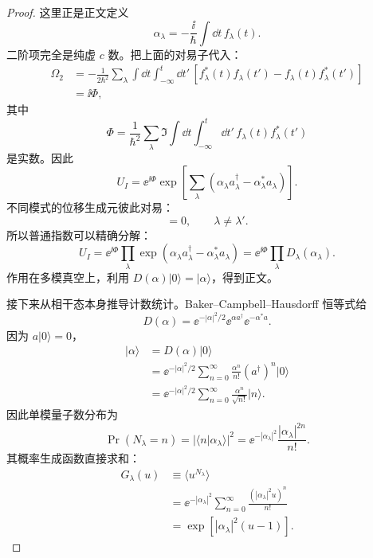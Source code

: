 \begin{proof}
这里正是正文定义
\begin{equation*}
 \alpha_\lambda=-\frac{\ii}{\hbar}\int\dd t\,f_\lambda(t).
\end{equation*}
二阶项完全是纯虚 $c$ 数。把上面的对易子代入：
\begin{align*}
 \Omega_2
 &=-\frac1{2\hbar^2}
 \sum_\lambda
 \int\dd t\int_{-\infty}^{t}\dd t'\,
 \left[f_\lambda^*(t)f_\lambda(t')
 -f_\lambda(t)f_\lambda^*(t')\right]\\
 &=\ii\Phi,
\end{align*}
其中
\begin{equation*}
 \Phi
 =\frac1{\hbar^2}
 \sum_\lambda
 \Im\int\dd t\int_{-\infty}^{t}\dd t'\,
 f_\lambda(t)f_\lambda^*(t')
\end{equation*}
是实数。因此
\begin{equation*}
 U_I
 =\ee^{\ii\Phi}
 \exp\!\left[
 \sum_\lambda
 (\alpha_\lambda a_\lambda^\dagger
 -\alpha_\lambda^*a_\lambda)
 \right].
\end{equation*}
不同模式的位移生成元彼此对易：
\begin{equation*}
 [\alpha_\lambda a_\lambda^\dagger-\alpha_\lambda^*a_\lambda,
 \alpha_{\lambda'}a_{\lambda'}^\dagger-\alpha_{\lambda'}^*a_{\lambda'}]=0,
 \qquad \lambda\neq\lambda'.
\end{equation*}
所以普通指数可以精确分解：
\begin{equation*}
 U_I
 =\ee^{\ii\Phi}\prod_\lambda
 \exp(\alpha_\lambda a_\lambda^\dagger-\alpha_\lambda^*a_\lambda)
 =\ee^{\ii\Phi}\prod_\lambda D_\lambda(\alpha_\lambda).
\end{equation*}
作用在多模真空上，利用 $D(\alpha)|0\rangle=|\alpha\rangle$，得到正文。

接下来从相干态本身推导计数统计。Baker--Campbell--Hausdorff 恒等式给
\begin{equation*}
 D(\alpha)
 =\ee^{-|\alpha|^2/2}
 \ee^{\alpha a^\dagger}\ee^{-\alpha^*a}.
\end{equation*}
因为 $a|0\rangle=0$，
\begin{align*}
 |\alpha\rangle
 &=D(\alpha)|0\rangle\\
 &=\ee^{-|\alpha|^2/2}
 \sum_{n=0}^{\infty}\frac{\alpha^n}{n!}(a^\dagger)^n|0\rangle\\
 &=\ee^{-|\alpha|^2/2}
 \sum_{n=0}^{\infty}\frac{\alpha^n}{\sqrt{n!}}|n\rangle.
\end{align*}
因此单模量子数分布为
\begin{equation*}
 \Pr(N_\lambda=n)
 =|\langle n|\alpha_\lambda\rangle|^2
 =\ee^{-|\alpha_\lambda|^2}
 \frac{|\alpha_\lambda|^{2n}}{n!}.
\end{equation*}
其概率生成函数直接求和：
\begin{align*}
 G_\lambda(u)
 &\equiv\langle u^{N_\lambda}\rangle\\
 &=\ee^{-|\alpha_\lambda|^2}
 \sum_{n=0}^{\infty}
 \frac{(|\alpha_\lambda|^2u)^n}{n!}\\
 &=\exp\!\left[|\alpha_\lambda|^2(u-1)\right].
\end{align*}


\end{proof}
